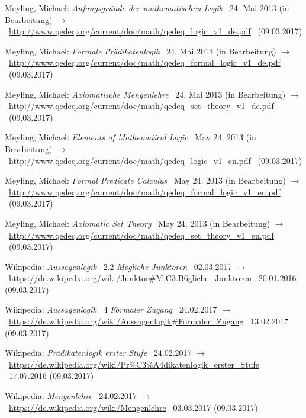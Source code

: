 \documentclass[english,ngerman,parskip=half,headsepline,footsepline]{scrreprt}
\begin{document}
\begin{flushleft}
\begin{thebibliography}{12}
			Meyling, Michael: \emph{Anfangsgründe der mathematischen Logik} \textendash\ 24. Mai 2013 (in Bearbeitung) $\rightarrow$~\url{http://www.qedeq.org/current/doc/math/qedeq_logic_v1_de.pdf} \textendash\ (09.03.2017)

			Meyling, Michael: \emph{Formale Prädikatenlogik} \textendash\ 24. Mai 2013 (in Bearbeitung) $\rightarrow$~\url{http://www.qedeq.org/current/doc/math/qedeq_formal_logic_v1_de.pdf} \textendash\ (09.03.2017)

			Meyling, Michael: \emph{Axiomatische Mengenlehre} \textendash\ 24. Mai 2013 (in Bearbeitung) $\rightarrow$~\url{http://www.qedeq.org/current/doc/math/qedeq_set_theory_v1_de.pdf} \textendash\ (09.03.2017)

			Meyling, Michael: \emph{Elements of Mathematical Logic} \textendash\ May 24, 2013 (in Bearbeitung) $\rightarrow$~\url{http://www.qedeq.org/current/doc/math/qedeq_logic_v1_en.pdf} \textendash\ (09.03.2017)

			Meyling, Michael: \emph{Formal Predicate Calculus} \textendash\ May 24, 2013 (in Bearbeitung) $\rightarrow$~\url{http://www.qedeq.org/current/doc/math/qedeq_formal_logic_v1_en.pdf} \textendash\ (09.03.2017)

			Meyling, Michael: \emph{Axiomatic Set Theory} \textendash\ May 24, 2013 (in Bearbeitung) $\rightarrow$~\url{http://www.qedeq.org/current/doc/math/qedeq_set_theory_v1_en.pdf} \textendash\ (09.03.2017)

			Wikipedia: \emph{Aussagenlogik} \chaptername~2.2 \emph{Mögliche Junktoren} \textendash\ 02.03.2017 $\rightarrow$~\url{https://de.wikipedia.org/wiki/Junktor#M.C3.B6gliche_Junktoren} \textendash\ 20.01.2016 (09.03.2017)

			Wikipedia: \emph{Aussagenlogik} \chaptername~4 \emph{Formaler Zugang} \textendash\ 24.02.2017 $\rightarrow$~\url{https://de.wikipedia.org/wiki/Aussagenlogik#Formaler_Zugang} \textendash\ 13.02.2017 (09.03.2017)

			Wikipedia: \emph{Prädikatenlogik erster Stufe} \textendash\ 24.02.2017  $\rightarrow$~\url{https://de.wikipedia.org/wiki/Pr%C3%A4dikatenlogik_erster_Stufe} \textendash\ 17.07.2016 (09.03.2017)

			Wikipedia: \emph{Mengenlehre} \textendash\ 24.02.2017 $\rightarrow$~\url{https://de.wikipedia.org/wiki/Mengenlehre} \textendash\ 03.03.2017 (09.03.2017)

		\end{thebibliography}
	\end{flushleft}
	\thispagestyle{scrheadings}
\end{document}
